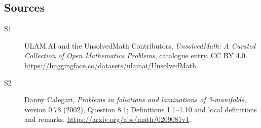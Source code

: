 \documentclass[11pt]{article}
\begin{document}
\subsection{Sources}
\begin{description}
\item[\hypertarget{source:statement:1}{S1}] ULAM.AI and the UnsolvedMath Contributors, \emph{UnsolvedMath: A Curated Collection of Open Mathematics Problems}, catalogue entry. CC BY 4.0. \url{https://huggingface.co/datasets/ulamai/UnsolvedMath}.
\item[\hypertarget{source:statement:2}{S2}] Danny Calegari, \emph{Problems in foliations and laminations of 3-manifolds}, version 0.78 (2002), Question 8.1; Definitions 1.1--1.10 and local definitions and remarks. \url{https://arxiv.org/abs/math/0209081v1}.
\end{description}
\label{end:statement}
\end{document}
